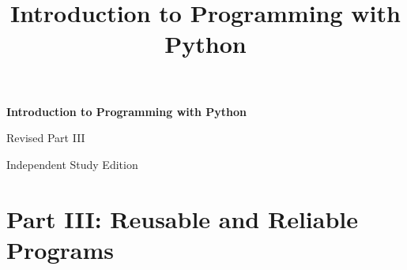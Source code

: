 \documentclass{textbook}
\title{Introduction to Programming with Python}
\providecommand{\toc}{\tableofcontents}
\begin{document}
\begin{titlepage}
    \centering
    \vspace*{0.22\textheight}
    {\Huge\bfseries Introduction to Programming with Python\par}
    \vspace{1.2em}
    {\Large Revised Part III\par}
    \vspace{0.8em}
    {\large Independent Study Edition\par}
    \vfill
\end{titlepage}

\toc
\clearpage

\part{Part III: Reusable and Reliable Programs}





\end{document}
